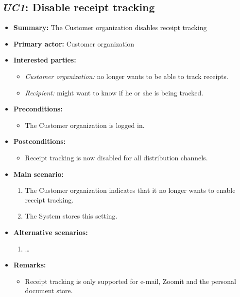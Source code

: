 \documentclass[a4paper,10pt]{article}
\begin{document}
\subsection{\emph{UC1}: Disable receipt tracking}
\begin{itemize}
	\item \textbf{Summary:} The Customer organization disables receipt tracking
    \item \textbf{Primary actor:} Customer organization
    \item \textbf{Interested parties:} 
        \begin{itemize}
            \item \textit{Customer organization:} no longer wants to be able to track receipts.
            \item \textit{Recipient:} might want to know if he or she is being tracked.
        \end{itemize}

    \item \textbf{Preconditions:}
        \begin{itemize}
            \item The Customer organization is logged in.
        \end{itemize}

    \item \textbf{Postconditions:}
        \begin{itemize}
            \item Receipt tracking is now disabled for all distribution channels.
        \end{itemize}
        
    \item \textbf{Main scenario:} 
    \begin{enumerate}
       \item The Customer organization indicates that it no longer wants to enable receipt tracking.
       \item The System stores this setting.
    \end{enumerate}

    \item \textbf{Alternative scenarios:} 
    \begin{enumerate}
        \item \ldots
    \end{enumerate}
    
    \item \textbf{Remarks:}
        \begin{itemize}
            \item Receipt tracking is only supported for e-mail, Zoomit and the personal document store.
        \end{itemize}
\end{itemize}
\end{document}
